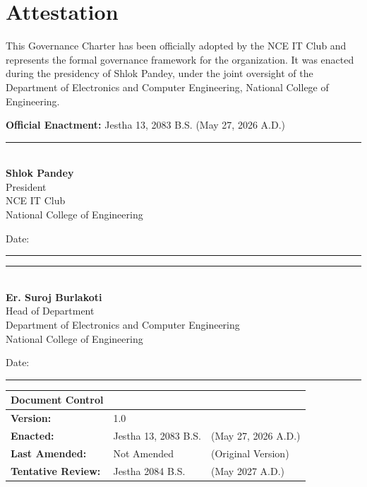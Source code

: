 \newpage
{}
{}
\section*{Attestation}

\noindent This Governance Charter has been officially adopted by the NCE IT Club and represents the formal governance framework for the organization. It was enacted during the presidency of Shlok Pandey, under the joint oversight of the Department of Electronics and Computer Engineering, National College of Engineering.

\vspace{1cm}

\noindent\textbf{Official Enactment:} Jestha 13, 2083 B.S. (May 27, 2026 A.D.)

\vspace{2cm}

\noindent\rule{7cm}{0.4pt}\\
\textbf{Shlok Pandey}\\
President\\
NCE IT Club\\
National College of Engineering\\


\vspace{0.3cm}

\noindent Date: \rule{4cm}{0.4pt}

\vspace{2cm}

\noindent\rule{7cm}{0.4pt}\\
\textbf{Er. Suroj Burlakoti}\\
Head of Department\\
Department of Electronics and Computer Engineering\\
National College of Engineering

\vspace{0.3cm}

\noindent Date: \rule{4cm}{0.4pt}

\vspace{1.5cm}

\begin{center}
\begin{tabular}{@{}p{4cm}p{4cm}p{4cm}@{}}
    \textbf{Document Control} & & \\
    \hline
    \textbf{Version:} & 1.0 & \\
    \textbf{Enacted:} & Jestha 13, 2083 B.S. & (May 27, 2026 A.D.) \\
    \textbf{Last Amended:} & Not Amended & (Original Version) \\
    \textbf{Tentative Review:} & Jestha 2084 B.S. & (May 2027 A.D.) \\
\end{tabular}
\end{center}
